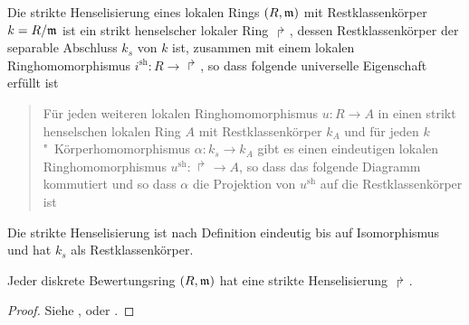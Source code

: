 
\begin{Definition}\label{def:striktehenselisierung}
  Die strikte Henselisierung eines lokalen Rings $(R,\mathfrak{m})$ mit
  Restklassenkörper $k=R/\mathfrak{m}$ ist ein strikt henselscher lokaler Ring
  $\Rsh$, dessen Restklassenkörper der separable Abschluss $k_s$ von
  $k$ ist, zusammen mit einem lokalen Ringhomomorphismus
  ${i^\text{sh}\colon R\to\Rsh}$, so dass folgende universelle
  Eigenschaft erfüllt ist
  \begin{quote}
    Für jeden weiteren lokalen Ringhomomorphismus $u\colon R\to A$ in
    einen strikt henselschen lokalen Ring $A$ mit Restklassenkörper
    $k_A$ und für jeden $k$"~Körperhomomorphismus $\alpha\colon k_s\to k_A$
    gibt es einen eindeutigen lokalen Ringhomomorphismus
    ${u^\text{sh}\colon\Rsh\to A}$, so dass das folgende Diagramm
    kommutiert und so dass $\alpha$ die Projektion von $u^\text{sh}$
    auf die Restklassenkörper ist
    \begin{center}
    \end{center}
  \end{quote}
  Die strikte Henselisierung ist nach Definition eindeutig bis auf
  Isomorphismus und hat $k_s$ als Restklassenkörper.
\end{Definition}

\begin{Satz}
  \label{thm:exhenselisierung}
  Jeder diskrete Bewertungsring $(R,\mathfrak{m})$ hat eine
  strikte Henselisierung $\Rsh$.
  \begin{proof}
    Siehe
    \cite[Proposition~IV.6.5]{silverman2},
    \cite[Remark~IV.6.6.2]{silverman2}
    oder \cite[Chapter~2.3, S.\,48]{neron}.
  \end{proof}
\end{Satz}

